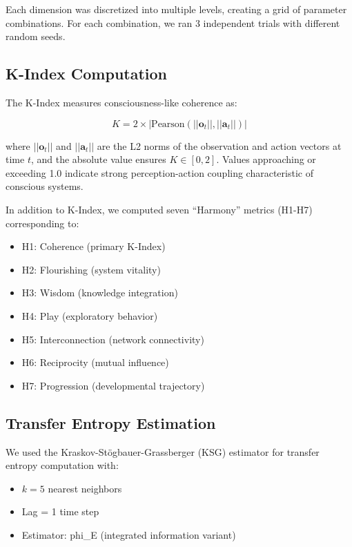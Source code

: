 \documentclass[10pt,letterpaper]{article}
\begin{document}
Each dimension was discretized into multiple levels, creating a grid of parameter combinations. For each combination, we ran 3 independent trials with different random seeds.

\subsection*{K-Index Computation}

The K-Index measures consciousness-like coherence as:

\begin{equation}
K = 2 \times |\text{Pearson}(||\mathbf{o}_t||, ||\mathbf{a}_t||)|
\end{equation}

where $||\mathbf{o}_t||$ and $||\mathbf{a}_t||$ are the L2 norms of the observation and action vectors at time $t$, and the absolute value ensures $K \in [0, 2]$. Values approaching or exceeding 1.0 indicate strong perception-action coupling characteristic of conscious systems.

In addition to K-Index, we computed seven ``Harmony'' metrics (H1-H7) corresponding to:
\begin{itemize}
    \item H1: Coherence (primary K-Index)
    \item H2: Flourishing (system vitality)
    \item H3: Wisdom (knowledge integration)
    \item H4: Play (exploratory behavior)
    \item H5: Interconnection (network connectivity)
    \item H6: Reciprocity (mutual influence)
    \item H7: Progression (developmental trajectory)
\end{itemize}

\subsection*{Transfer Entropy Estimation}

We used the Kraskov-St\"ogbauer-Grassberger (KSG) estimator for transfer entropy computation with:
\begin{itemize}
    \item $k = 5$ nearest neighbors
    \item Lag = 1 time step
    \item Estimator: phi\_E (integrated information variant)
\end{itemize}
\end{document}
